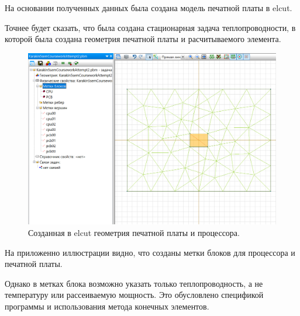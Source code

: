 На основании полученных данных была создана модель печатной платы в
elcut.

Точнее будет сказать, что была создана стационарная задача
теплопроводности, в которой была создана геометрия печатной платы и
расчитываемого элемента.

\begin{figure}[h]
  \centering
  \includegraphics[scale = 0.40]{images2/elcut_model.png}
  \caption{ Созданная в elcut геометрия печатной платы и процессора. }
\end{figure}

На приложенно иллюстрации видно, что созданы метки блоков
для процессора и печатной платы.

Однако в метках блока возможно указать только теплопроводность, а не
температуру или рассеиваемую мощность. Это обусловлено спецификой
программы и использования метода конечных элементов.

